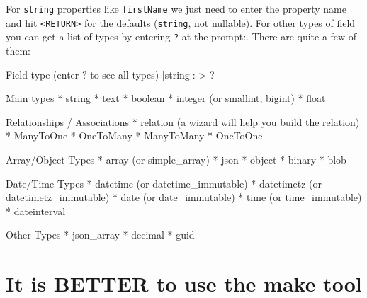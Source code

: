 \documentclass[a4paperpaper,openright]{book}
\newenvironment{Shaded}{}{}
\newcommand{\ExtensionTok}[1]{#1}
\newcommand{\NormalTok}[1]{#1}
\newcommand{\OperatorTok}[1]{\textcolor[rgb]{0.40,0.40,0.40}{#1}}
\begin{document}
For \texttt{string} properties like \texttt{firstName} we just need to
enter the property name and hit \texttt{\textless{}RETURN\textgreater{}}
for the defaults (\texttt{string}, not nullable). For other types of
field you can get a list of types by entering \texttt{?} at the prompt:.
There are quite a few of them:

\begin{Shaded}
\begin{Highlighting}[]
     \ExtensionTok{Field}\NormalTok{ type (enter ? to see all types) [}\ExtensionTok{string}\NormalTok{]:}
     \OperatorTok{>} \ExtensionTok{?}
    
    \ExtensionTok{Main}\NormalTok{ types}
      \ExtensionTok{*}\NormalTok{ string}
      \ExtensionTok{*}\NormalTok{ text}
      \ExtensionTok{*}\NormalTok{ boolean}
      \ExtensionTok{*}\NormalTok{ integer (or smallint, bigint)}
      \ExtensionTok{*}\NormalTok{ float}
    
    \ExtensionTok{Relationships}\NormalTok{ / Associations}
      \ExtensionTok{*}\NormalTok{ relation (a wizard   will help you build the relation)}
      \ExtensionTok{*}\NormalTok{ ManyToOne}
      \ExtensionTok{*}\NormalTok{ OneToMany}
      \ExtensionTok{*}\NormalTok{ ManyToMany}
      \ExtensionTok{*}\NormalTok{ OneToOne}
    
    \ExtensionTok{Array/Object}\NormalTok{ Types}
      \ExtensionTok{*}\NormalTok{ array (or simple_array)}
      \ExtensionTok{*}\NormalTok{ json}
      \ExtensionTok{*}\NormalTok{ object}
      \ExtensionTok{*}\NormalTok{ binary}
      \ExtensionTok{*}\NormalTok{ blob}
    
    \ExtensionTok{Date/Time}\NormalTok{ Types}
      \ExtensionTok{*}\NormalTok{ datetime (or datetime_immutable)}
      \ExtensionTok{*}\NormalTok{ datetimetz (or datetimetz_immutable)}
      \ExtensionTok{*}\NormalTok{ date (or date_immutable)}
      \ExtensionTok{*}\NormalTok{ time (or time_immutable)}
      \ExtensionTok{*}\NormalTok{ dateinterval}
    
    \ExtensionTok{Other}\NormalTok{ Types}
      \ExtensionTok{*}\NormalTok{ json_array}
      \ExtensionTok{*}\NormalTok{ decimal}
      \ExtensionTok{*}\NormalTok{ guid}
\end{Highlighting}
\end{Shaded}

\hypertarget{it-is-better-to-use-the-make-tool}{%
\section{It is BETTER to use the make
tool}\label{it-is-better-to-use-the-make-tool}}
\end{document}

